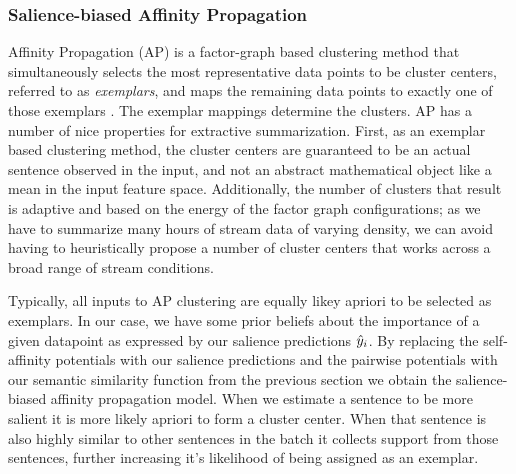 \subsubsection{Salience-biased Affinity Propagation}


    Affinity Propagation (AP) is a factor-graph based clustering
    method that simultaneously selects the most representative data points 
    to be cluster centers, referred to as \emph{exemplars},  and maps 
    the remaining data points to exactly one of those exemplars 
    \citep{frey2007clustering}. 
    The exemplar mappings determine the clusters.
    AP has a number of nice properties for extractive summarization.
    First, as an exemplar based clustering method, the cluster centers
    are guaranteed to be an actual sentence observed in the input, and not 
    an abstract mathematical object like a mean in the input 
    feature space.
    Additionally, the number of clusters that result is adaptive and 
    based on the energy of the factor graph configurations; as we have to 
    summarize many hours of stream data of varying density, we can avoid
    having to heuristically propose a number of cluster centers that works
    across a broad range of stream conditions.


 Typically, all inputs to AP clustering are equally likey apriori to
 be selected as exemplars.
 In our case, we have some prior beliefs about the importance of 
a given datapoint as expressed by our salience predictions $\hat{y}_i$.
By replacing the self-affinity potentials with our salience predictions
and the pairwise potentials with our semantic similarity function from the 
previous section %
we obtain the salience-biased affinity propagation model.
When we estimate a sentence to be more salient it is more likely apriori
to form a cluster center. When that sentence is also highly similar to other 
sentences in the batch it collects support from those sentences, further
increasing it's likelihood of being assigned as an exemplar.
 



